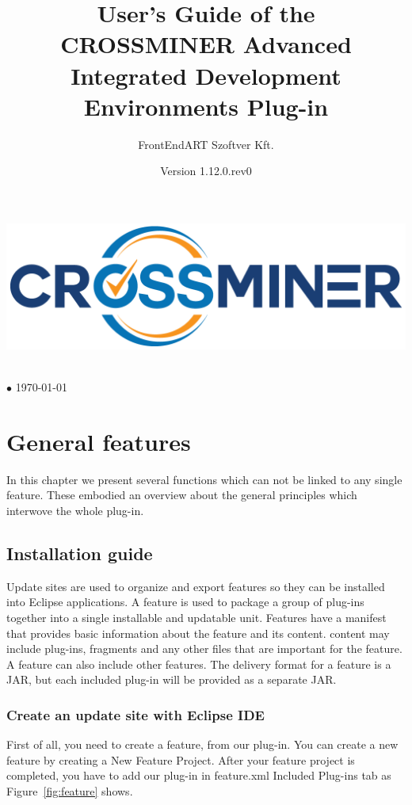 \documentclass[11pt,a4paper]{book}
\author{FrontEndART Szoftver Kft.}
\title{User's Guide of the CROSSMINER Advanced Integrated Development Environments Plug-in}
\date{Version 1.12.0.rev0}
\makeatletter
\renewcommand{\maketitle}{
\vspace*{.1\textheight}
\begin{center}
	\includegraphics[width=.6\textwidth]{pic/CROSSMINER-logo-large.png}
\end{center}
\begin{center}
	\Huge\@title
\end{center}
\vfill
\begin{center}
	\large\@author\\\@date{} $\bullet$ \today
\end{center}
}
\makeatother
\begin{document}
	
\begin{titlepage}
	\maketitle
\end{titlepage}

\tableofcontents

\chapter{General features}

In this chapter we present several functions which can not be linked to any single feature.
These embodied an overview about the general principles which interwove the whole plug-in.

\section{Installation guide}
Update sites are used to organize and export features so they can be installed into Eclipse applications. A feature is used to package a group of plug-ins together into a single installable and updatable unit. Features have a manifest that provides basic information about the feature and its content. content may include plug-ins, fragments and any other files that are important for the feature. A feature can also include other features. The delivery format for a feature is a JAR, but each included plug-in will be provided as a separate JAR.

\subsection{Create an update site with Eclipse IDE}

First of all, you need to create a feature, from our plug-in. You can create a new feature by creating a New Feature Project. After your feature project is completed, you have to add our plug-in in feature.xml Included Plug-ins tab as Figure~\ref{fig:feature} shows.
\end{document}
